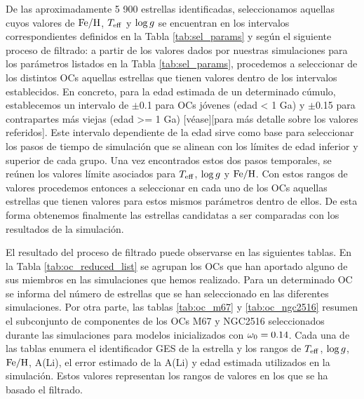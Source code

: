 De las aproximadamente 5 900 estrellas identificadas, seleccionamos aquellas cuyos valores de $\mathrm{Fe}/\mathrm{H}$, $T_{\mathrm{eff}}$ y $\mathrm{log} \, g$ se encuentran en los intervalos correspondientes definidos en la Tabla \ref{tab:sel_params} y según el siguiente proceso de filtrado: a partir de los valores dados por nuestras simulaciones para los parámetros listados en la Tabla \ref{tab:sel_params}, procedemos a seleccionar de los distintos OCs aquellas estrellas que tienen valores dentro de los intervalos establecidos. En concreto, para la edad estimada de un determinado cúmulo, establecemos un intervalo de $\pm$0.1 para OCs jóvenes (edad < 1 Ga) y $\pm$0.15 para contrapartes más viejas (edad >= 1 Ga) \citep{Cantat-Gaudin2020}[véase][para más detalle sobre los valores referidos]. Este intervalo dependiente de la edad sirve como base para seleccionar los pasos de tiempo de simulación que se alinean con los límites de edad inferior y superior de cada grupo. Una vez encontrados estos dos pasos temporales, se reúnen los valores límite asociados para $T_{\mathrm{eff}}$, $\mathrm{log} \, g$ y $\mathrm{Fe}/\mathrm{H}$. Con estos rangos de valores procedemos entonces a seleccionar en cada uno de los OCs aquellas estrellas que tienen valores para estos mismos parámetros dentro de ellos. De esta forma obtenemos finalmente las estrellas candidatas a ser comparadas con los resultados de la simulación.\par

El resultado del proceso de filtrado puede observarse en las siguientes tablas. En la Tabla \ref{tab:oc_reduced_list} se agrupan los OCs que han aportado alguno de sus miembros en las simulaciones que hemos realizado. Para un determinado OC se informa del número de estrellas que se han seleccionado en las diferentes simulaciones. Por otra parte, las tablas \ref{tab:oc_m67} y \ref{tab:oc_ngc2516} resumen el subconjunto de componentes de los OCs M67 y NGC2516 seleccionados durante las simulaciones para modelos inicializados con $\omega_{\mathrm{0}} = 0.14$. Cada una de las tablas enumera el identificador GES de la estrella y los rangos de $T_{\mathrm{eff}}$, $\mathrm{log} \, g$, $\mathrm{Fe}/\mathrm{H}$, A(Li), el error estimado de la A(Li) y edad estimada utilizados en la simulación. Estos valores representan los rangos de valores en los que se ha basado el filtrado.


\newpage
{}
\recalctypearea

